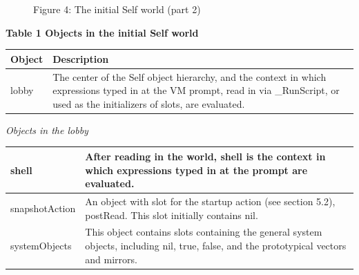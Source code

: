 \documentclass[letterpaper,10pt,english]{sphinxmanual}
\begin{document}
\begin{figure}[htbp]\begin{flushleft}
\capstart

\caption{Figure 4: The initial Self world (part 2)}\end{flushleft}\end{figure}

\textbf{Table 1 Objects in the initial Self world}

\begin{tabulary}{\linewidth}{p{5cm} p{10cm}}
\hline

Object
 & 
Description
\\\hline

lobby
 & 
The center of the Self object hierarchy, and the context in which expressions typed in at the VM prompt, read in via \_RunScript, or used as the initializers of slots, are evaluated.
\\\hline
\end{tabulary}


\emph{Objects in the lobby}

\begin{tabulary}{\linewidth}{p{5cm} p{10cm}}
\hline

shell
 & 
After reading in the world, shell is the context in which expressions typed in at the prompt are evaluated.
\\\hline

snapshotAction
 & 
An object with slot for the startup action (see section 5.2), postRead. This slot initially contains nil.
\\\hline

systemObjects
 & 
This object contains slots containing the general system objects, including nil, true, false, and the prototypical vectors and mirrors.
\\\hline
\end{tabulary}
\end{document}
